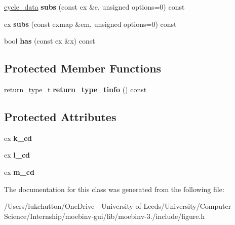 \begin{DoxyCompactItemize}
\mbox{\hyperlink{class_moeb_inv_1_1cycle__data}{cycle\+\_\+data}} {\bfseries subs} (const ex \&e, unsigned options=0) const
\item 
\mbox{\label{class_moeb_inv_1_1cycle__data_ad289268df1f5c1b1f65339452c29b78e}} 
ex {\bfseries subs} (const exmap \&em, unsigned options=0) const
\item 
\mbox{\label{class_moeb_inv_1_1cycle__data_aba9cb24c59c66ee9e4a492e6c3e77e55}} 
bool {\bfseries has} (const ex \&x) const
\end{DoxyCompactItemize}
\subsection*{Protected Member Functions}
\begin{DoxyCompactItemize}
\item 
\mbox{\label{class_moeb_inv_1_1cycle__data_a481666437b2214e5f1e95e2e850b4fc2}} 
return\+\_\+type\+\_\+t {\bfseries return\+\_\+type\+\_\+tinfo} () const
\end{DoxyCompactItemize}
\subsection*{Protected Attributes}
\begin{DoxyCompactItemize}
\item 
\mbox{\label{class_moeb_inv_1_1cycle__data_a463857573ea7626dd56dffb02092a1e8}} 
ex {\bfseries k\+\_\+cd}
\item 
\mbox{\label{class_moeb_inv_1_1cycle__data_a304af6c44b4177ef249d03d3296c39c7}} 
ex {\bfseries l\+\_\+cd}
\item 
\mbox{\label{class_moeb_inv_1_1cycle__data_a5278e6e5e51d1e1678417a18440aed4f}} 
ex {\bfseries m\+\_\+cd}
\end{DoxyCompactItemize}


The documentation for this class was generated from the following file\+:\begin{DoxyCompactItemize}
\item 
/\+Users/lukehutton/\+One\+Drive -\/ University of Leeds/\+University/\+Computer Science/\+Internship/moebinv-\/gui/lib/moebinv-\/3./include/figure.\+h\end{DoxyCompactItemize}
